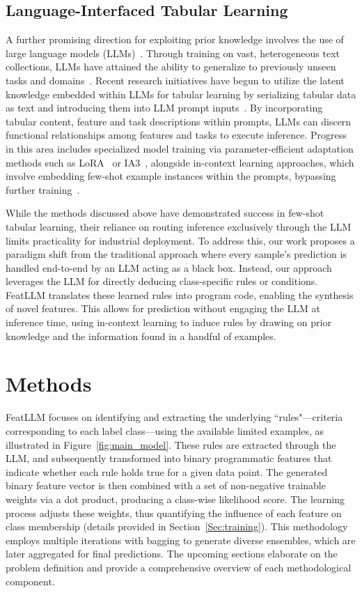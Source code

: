 \subsection{Language-Interfaced Tabular Learning} A further promising direction for exploiting prior knowledge involves the use of large language models (LLMs)~\cite{anil2023palm,openai2023gpt4}. Through training on vast, heterogeneous text collections, LLMs have attained the ability to generalize to previously unseen tasks and domains~\cite{brown2020language}. Recent research initiatives have begun to utilize the latent knowledge embedded within LLMs for tabular learning by serializing tabular data as text and introducing them into LLM prompt inputs~\cite{dinh2022lift,hegselmann2023tabllm,wang2023anypredict}. By incorporating tabular content, feature and task descriptions within prompts, LLMs can discern functional relationships among features and tasks to execute inference. Progress in this area includes specialized model training via parameter-efficient adaptation methods such as LoRA~\cite{hu2021lora} or IA3~\cite{liu2022few}, alongside in-context learning approaches, which involve embedding few-shot example instances within the prompts, bypassing further training~\cite{dinh2022lift,hegselmann2023tabllm,nam2023semi,slack2023tablet}.

While the methods discussed above have demonstrated success in few-shot tabular learning, their reliance on routing inference exclusively through the LLM limits practicality for industrial deployment. To address this, our work proposes a paradigm shift from the traditional approach where every sample’s prediction is handled end-to-end by an LLM acting as a black box. Instead, our approach leverages the LLM for directly deducing class-specific rules or conditions. \textsf{FeatLLM} translates these learned rules into program code, enabling the synthesis of novel features. This allows for prediction without engaging the LLM at inference time, using in-context learning to induce rules by drawing on prior knowledge and the information found in a handful of examples.

\section{Methods}
\textsf{FeatLLM} focuses on identifying and extracting the underlying ``rules"—criteria corresponding to each label class—using the available limited examples, as illustrated in Figure~\ref{fig:main_model}. These rules are extracted through the LLM, and subsequently transformed into binary programmatic features that indicate whether each rule holds true for a given data point. The generated binary feature vector is then combined with a set of non-negative trainable weights via a dot product, producing a class-wise likelihood score. The learning process adjusts these weights, thus quantifying the influence of each feature on class membership (details provided in Section~\ref{Sec:training}). This methodology employs multiple iterations with bagging to generate diverse ensembles, which are later aggregated for final predictions. The upcoming sections elaborate on the problem definition and provide a comprehensive overview of each methodological component.

